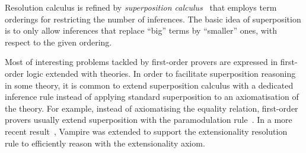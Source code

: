 Resolution calculus is refined by \emph{superposition calculus}~\cite{BG90, BG94} that employs term orderings for restricting the number of inferences. The basic idea of superposition is to only allow inferences that replace ``big'' terms by ``smaller'' ones, with respect to the given ordering.




Most of interesting problems tackled by first-order provers are expressed in first-order logic extended with theories. In order to facilitate superposition reasoning in some theory, it is common to extend superposition calculus with a dedicated inference rule instead of applying standard superposition to an axiomatisation of the theory. For example, instead of axiomatising the equality relation, first-order provers usually extend superposition with the paramodulation rule~\cite{WRCS67,Robinson1969}. In a more recent result~\cite{ATVA14}, Vampire was extended to support the extensionality resolution rule to efficiently reason with the extensionality axiom.

